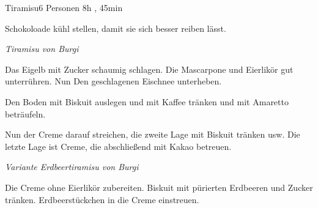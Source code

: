 \documentclass[../recipe-collections/cooking.tex]{subfiles}
\begin{document}
\begin{recipe}{Tiramisu}{6 Personen }{8h , 45min }
  \freeform\hrulefill

  \freeform{}
  Schokoloade kühl stellen, damit sie sich besser reiben lässt.

  \newpage{}

  \freeform\hrulefill
  \freeform{}\textit{Tiramisu von Burgi}


  Das Eigelb mit Zucker schaumig schlagen.
  Die Mascarpone und Eierlikör gut unterrühren.
  Nun Den geschlagenen Eischnee unterheben.


  Den Boden mit Biskuit auslegen und mit Kaffee tränken und mit Amaretto beträufeln.

  \newstep{}Nun  der Creme darauf streichen, die zweite Lage mit Biskuit tränken usw.
  Die letzte Lage ist Creme, die abschließend mit Kakao betreuen.

  \freeform{}\hrulefill{}

  \freeform{}\textit{Variante Erdbeertiramisu von Burgi}


  Die Creme ohne Eierlikör zubereiten.
  Biskuit mit pürierten Erdbeeren und Zucker tränken.
  Erdbeerstückchen in die Creme einstreuen.

  \freeform{}\hrulefill{}

\end{recipe}
\end{document}
